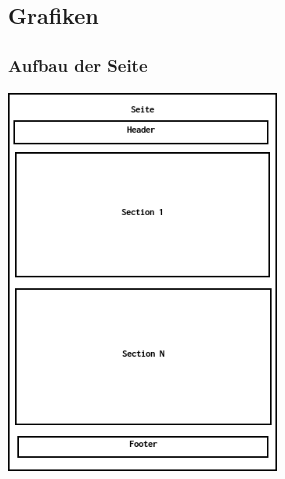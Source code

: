 \documentclass[11pt,a4paper]{article}
\begin{document}
\begin{appendices}

\begin{landscape}

\end{landscape}

\subsection{Grafiken}
\subsubsection{Aufbau der Seite}
\label{sec:epage}
\includegraphics[scale=0.5,height=10cm]{Seite}

\end{appendices}
\end{document}
